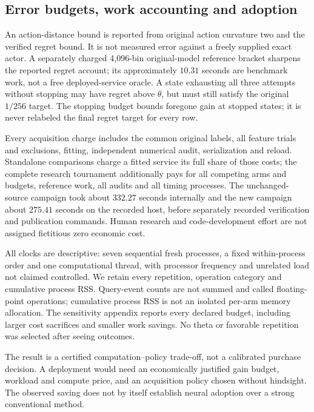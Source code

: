 \subsection{Error budgets, work accounting and adoption}
An action-distance bound is reported from original action curvature two and the verified regret bound. It is not measured error against a freely supplied exact actor. A separately charged 4,096-bin original-model reference bracket sharpens the reported regret account; its approximately $10.31$ seconds are benchmark work, not a free deployed-service oracle. A state exhausting all three attempts without stopping may have regret above $\theta$, but must still satisfy the original $1/256$ target. The stopping budget bounds foregone gain at stopped states; it is never relabeled the final regret target for every row.

Every acquisition charge includes the common original labels, all feature trials and exclusions, fitting, independent numerical audit, serialization and reload. Standalone comparisons charge a fitted service its full share of those costs; the complete research tournament additionally pays for all competing arms and budgets, reference work, all audits and all timing processes. The unchanged-source campaign took about $332.27$ seconds internally and the new campaign about $275.41$ seconds on the recorded host, before separately recorded verification and publication commands. Human research and code-development effort are not assigned fictitious zero economic cost.

All clocks are descriptive: seven sequential fresh processes, a fixed within-process order and one computational thread, with processor frequency and unrelated load not claimed controlled. We retain every repetition, operation category and cumulative process RSS. Query-event counts are not summed and called floating-point operations; cumulative process RSS is not an isolated per-arm memory allocation. The sensitivity appendix reports every declared budget, including larger cost sacrifices and smaller work savings. No theta or favorable repetition was selected after seeing outcomes.

The result is a certified computation--policy trade-off, not a calibrated purchase decision. A deployment would need an economically justified gain budget, workload and compute price, and an acquisition policy chosen without hindsight. The observed saving does not by itself establish neural adoption over a strong conventional method.

